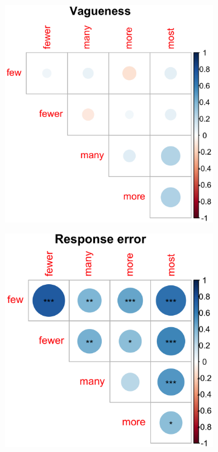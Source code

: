 \documentclass{article}
\begin{document}
\begin{figure} [H]
\begin{minipage}[t]{\textwidth}
\begin{minipage}[t]{0.49\textwidth}
    \begin{subfigure}[t]{\linewidth}
     \includegraphics[width=\linewidth]{Figure2.3b.png}
     \caption{\label{fig:fig2.3b}}
    \end{subfigure}
    \end{minipage}
    \hfill
    \begin{minipage}[t]{0.49\textwidth}
    \begin{subfigure}[t]{\linewidth}
     \includegraphics[width=\linewidth]{Figure2.3c.png}

\end{subfigure}
\end{minipage}
\end{minipage}
\end{figure}
\end{document}
